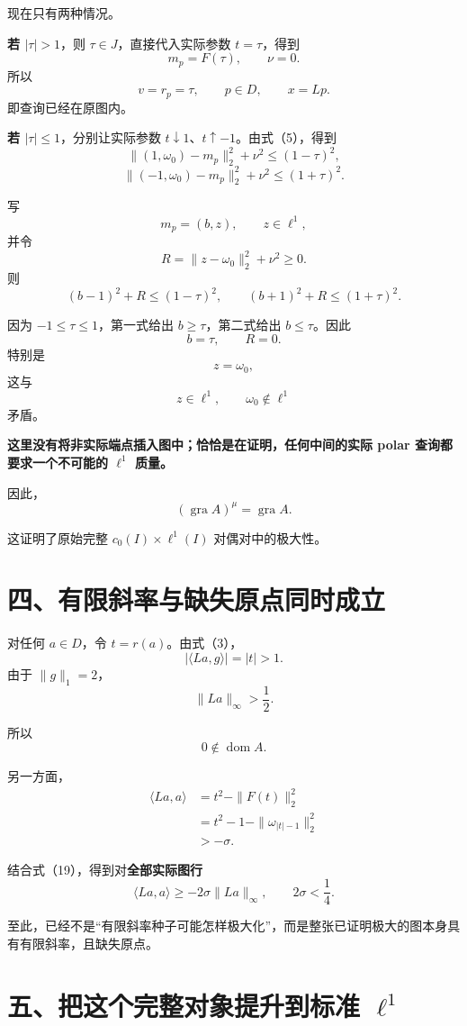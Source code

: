 \documentclass[UTF8,fontset=fandol,11pt,a4paper]{ctexart}
\begin{document}
现在只有两种情况。

\textbf{若 $|\tau|>1$}，则 $\tau\in J$，直接代入实际参数 $t=\tau$，得到 \[
m_p=F(\tau),\qquad \nu=0.
\] 所以 \[
v=r_p=\tau,\qquad p\in D,\qquad x=Lp.
\] 即查询已经在原图内。

\textbf{若 $|\tau|\le1$}，分别让实际参数 $t\downarrow1$、$t\uparrow-1$。由式（5），得到 \[
\|(1,\omega_0)-m_p\|_2^2+\nu^2
\le(1-\tau)^2,
\] \[
\|(-1,\omega_0)-m_p\|_2^2+\nu^2
\le(1+\tau)^2.
\tag{17}
\]

写 \[
m_p=(b,z),\qquad z\in\ell^1,
\] 并令 \[
R=\|z-\omega_0\|_2^2+\nu^2\ge0.
\] 则 \[
(b-1)^2+R\le(1-\tau)^2,
\qquad
(b+1)^2+R\le(1+\tau)^2.
\]

因为 $-1\le\tau\le1$，第一式给出 $b\ge\tau$，第二式给出 $b\le\tau$。因此 \[
b=\tau,\qquad R=0.
\] 特别是 \[
z=\omega_0,
\] 这与 \[
z\in\ell^1,\qquad\omega_0\notin\ell^1
\] 矛盾。

\textbf{这里没有将非实际端点插入图中；恰恰是在证明，任何中间的实际 polar 查询都要求一个不可能的 $\ell^1$ 质量。}

因此， \[
\boxed{
(\operatorname{gra}A)^\mu=\operatorname{gra}A.
}
\tag{18}
\]

这证明了原始完整 $c_0(I)\times\ell^1(I)$ 对偶对中的极大性。

\section{四、有限斜率与缺失原点同时成立}\label{ux56dbux6709ux9650ux659cux7387ux4e0eux7f3aux5931ux539fux70b9ux540cux65f6ux6210ux7acb}

对任何 $a\in D$，令 $t=r(a)$。由式（3）， \[
|\langle La,g\rangle|=|t|>1.
\] 由于 $\|g\|_1=2$， \[
\|La\|_\infty>\frac12.
\tag{19}
\]

所以 \[
0\notin\operatorname{dom}A.
\]

另一方面， \[
\begin{aligned}
\langle La,a\rangle
&=t^2-\|F(t)\|_2^2\\
&=t^2-1-\|\omega_{|t|-1}\|_2^2\\
&>-\sigma.
\end{aligned}
\]

结合式（19），得到对\textbf{全部实际图行} \[
\boxed{
\langle La,a\rangle
\ge-2\sigma\|La\|_\infty,
\qquad 2\sigma<\frac14.
}
\tag{20}
\]

至此，已经不是``有限斜率种子可能怎样极大化''，而是整张已证明极大的图本身具有有限斜率，且缺失原点。

\section{\texorpdfstring{五、把这个完整对象提升到标准 $\ell^1$}{五、把这个完整对象提升到标准 \textbackslash ell\^{}1}}\label{ux4e94ux628aux8fd9ux4e2aux5b8cux6574ux5bf9ux8c61ux63d0ux5347ux5230ux6807ux51c6-ell1}
\end{document}

